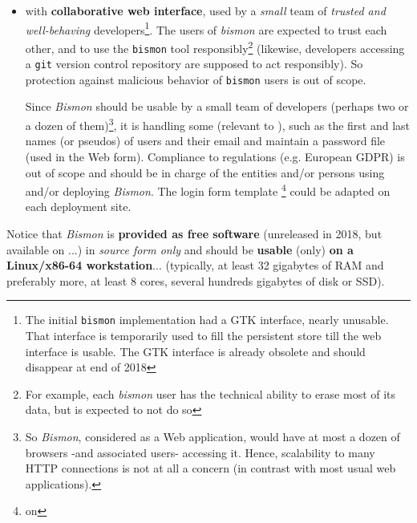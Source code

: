 \begin{itemize}
    \item with \textbf{collaborative web interface}, used by a
      \emph{small} team of \emph{trusted and well-behaving}
      developers\footnote{The initial \texttt{bismon} implementation
        had a GTK interface, nearly unusable. That interface is
        temporarily used to fill the persistent store till the web
        interface is usable. The GTK interface is already obsolete and
        should disappear at end of 2018}. The users of \emph{bismon}
      are expected to trust each other, and to use the \texttt{bismon}
      tool responsibly\footnote{For example, each \emph{bismon} user
        has the technical ability to erase most of its data, but is
        expected to not do so} (likewise, developers accessing a
      \texttt{git} version control repository are supposed to act
      responsibly). So protection against malicious behavior of
      \texttt{bismon} users is out of scope.

      Since \textit{Bismon} should be usable by a small team of
      developers (perhaps two or a dozen of them)\footnote{So
        \textit{Bismon}, considered as a Web application, would have
        at most a dozen of browsers -and associated users- accessing
        it. Hence, scalability to many HTTP connections is not at all
        a concern (in contrast with most usual web applications).}, it
      is handling some  (relevant
      to ), such as the first and last names (or
      pseudos) of users and their email and maintain a password file
      (used in the Web  form). Compliance to
      regulations (e.g. European GDPR) is out of scope and should be
      in charge of the entities and/or persons using and/or deploying
      \textit{Bismon}. The login form template \footnote{on
        }
      could be adapted on each deployment site.
\end{itemize}

Notice that \textit{Bismon} is \textbf{provided as free software}
(unreleased in 2018, but available on
 ...) in \emph{source form only} and
should be \textbf{usable} (only) \textbf{on a Linux/x86-64
  workstation}... (typically, at least 32 gigabytes of RAM and
preferably more, at least 8 cores, several hundreds gigabytes of disk
or SSD).

